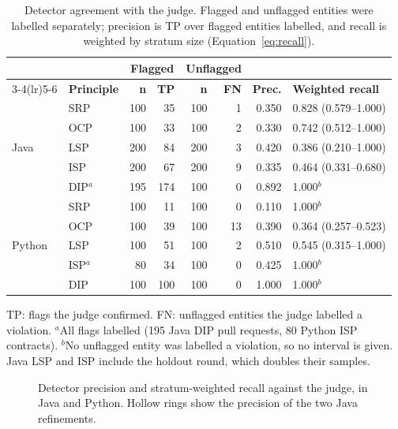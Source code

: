 \documentclass[sigconf]{acmart}
\begin{document}
\begin{table}[t]
\caption{Detector agreement with the judge. Flagged and unflagged entities were labelled
separately; precision is TP over flagged entities labelled, and recall is weighted by stratum size
(Equation~\ref{eq:recall}).}
\label{tab:validation}
\footnotesize
\setlength{\tabcolsep}{2.6pt}
\begin{tabular}{@{}llrrrrrl@{}}
\toprule
 & & \multicolumn{2}{c}{\textbf{Flagged}} & \multicolumn{2}{c}{\textbf{Unflagged}} & & \\
\cmidrule(lr){3-4}\cmidrule(lr){5-6}
 & \textbf{Principle} & \textbf{n} & \textbf{TP} & \textbf{n} & \textbf{FN} & \textbf{Prec.} & \textbf{Weighted recall} \\
\midrule
\multirow{5}{*}{Java}
 & SRP &  100 &  35 & 100 & 1 & 0.350 & 0.828 (0.579--1.000) \\
 & OCP &  100 &  33 & 100 & 2 & 0.330 & 0.742 (0.512--1.000) \\
 & LSP &  200 &  84 & 200 & 3 & 0.420 & 0.386 (0.210--1.000) \\
 & ISP &  200 &  67 & 200 & 9 & 0.335 & 0.464 (0.331--0.680) \\
 & DIP$^a$ & 195 & 174 & 100 & 0 & 0.892 & 1.000$^b$ \\
\midrule
\multirow{5}{*}{Python}
 & SRP &  100 &  11 & 100 &  0 & 0.110 & 1.000$^b$ \\
 & OCP &  100 &  39 & 100 & 13 & 0.390 & 0.364 (0.257--0.523) \\
 & LSP &  100 &  51 & 100 &  2 & 0.510 & 0.545 (0.315--1.000) \\
 & ISP$^a$ & 80 & 34 & 100 &  0 & 0.425 & 1.000$^b$ \\
 & DIP &  100 & 100 & 100 &  0 & 1.000 & 1.000$^b$ \\
\bottomrule
\end{tabular}

\vspace{3pt}
\raggedright\scriptsize TP: flags the judge confirmed. FN: unflagged entities the judge labelled a
violation. $^a$All flags labelled (195 Java DIP pull requests, 80 Python ISP contracts). $^b$No
unflagged entity was labelled a violation, so no interval is given. Java LSP and ISP include the
holdout round, which doubles their samples.
\end{table}

\begin{figure}[t]
\centering

\caption{Detector precision and stratum-weighted recall against the judge, in Java and Python. Hollow
rings show the precision of the two Java refinements.}
\label{fig:validation}
\end{figure}
\end{document}
